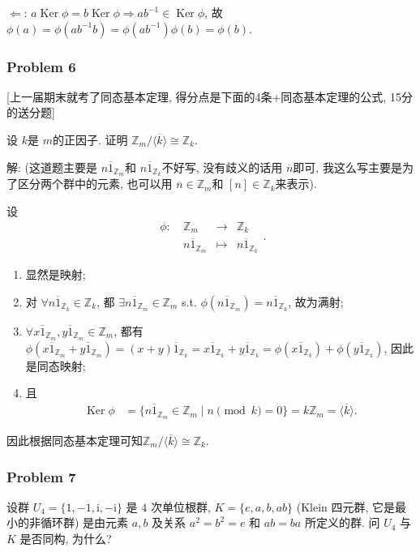 \documentclass[a4paper,12pt]{ctexart}
\newcommand{\Z}{\mathbb{Z}}
\begin{document}
  $ \Leftarrow $: $ a\operatorname{Ker}\phi=b\operatorname{Ker}\phi\Rightarrow ab^{-1}\in\operatorname{Ker}\phi $, 故
  $ \phi(a)=\phi(ab^{-1}b)=\phi(ab^{-1})\phi(b)=\phi(b) $.

\subsubsection*{Problem 6}
  [上一届期末就考了同态基本定理, 得分点是下面的4条+同态基本定理的公式, 15分的送分题] 
  
  设 $ k $是 $ m $的正因子. 证明 $ \Z_m/\langle\overline{k}\rangle\cong\Z_k $.
  
  解: (这道题主要是 $ n\overline{1}_{\Z_m} $和 $ n\overline{1}_{\Z_k} $不好写, 没有歧义的话用 $ \overline{n} $即可, 我这么写主要是为了区分两个群中的元素, 也可以用 $ \overline{n}\in\Z_m $和 $ [n]\in\Z_k $来表示).

  设 
  \[\begin{array}{cccc}
    \phi:&~\Z_m&\rightarrow&\Z_k\\
    &~n\overline{1}_{\Z_m}&\mapsto& n\overline{1}_{\Z_k}
  \end{array}.\]
  \begin{enumerate}[label=(\arabic{*})]
    \item 显然是映射;
    \item 对 $ \forall n\overline{1}_{\Z_k}\in\Z_{k} $, 都 $\exists n\overline{1}_{\Z_m}\in\Z_m $ s.t.
    $ \phi(n\overline{1}_{\Z_m})=n\overline{1}_{\Z_k} $, 故为满射;
    \item $ \forall x\overline{1}_{\Z_m},y\overline{1}_{\Z_m}\in\Z_m $, 
    都有 $ \phi(x\overline{1}_{\Z_m}+y\overline{1}_{\Z_m})=(x+y)\overline{1}_{\Z_k}=x\overline{1}_{\Z_k}+y\overline{1}_{\Z_k}=\phi(x\overline{1}_{\Z_k})+\phi(y\overline{1}_{\Z_k}) $, 因此是同态映射;
    \item 且
    \begin{align*}
      \operatorname{Ker}\phi&=\{n\overline{1}_{\Z_m}\in\Z_m\mid n\pmod{k}=0\}=k\Z_m=\langle\overline{k}\rangle.
    \end{align*}
  \end{enumerate}
  因此根据同态基本定理可知$ \Z_m/\langle\overline{k}\rangle\cong\Z_k $.

\subsubsection*{Problem 7}
设群 $U_{4}=\{1,-1, \mathrm{i},-\mathrm{i}\}$ 是 $4$ 次单位根群, $K=\{e, a, b, ab\}$  
(Klein 四元群, 它是最小的非循环群) 是由元素
    $a, b$ 及关系 $a^{2}=b^{2}=e$ 和 $a b=b a$ 所定义的群. 问 $U_{4}$ 与 $K$ 是否同构, 为什么?
\end{document}
